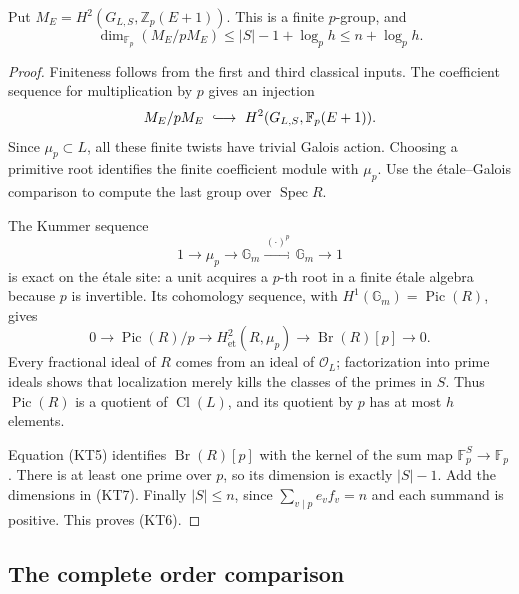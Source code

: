 \begin{lemma}\label{kt-rank}
Put \(M_E=H^2(G_{L,S},\mathbb Z_p(E+1))\).
This is a finite \(p\)-group, and
\[
 \dim_{\mathbb F_p}(M_E/pM_E)
       \le |S|-1+\log_p h
       \le n+\log_p h .
 \tag{KT6}
\]
\end{lemma}
\begin{proof}
Finiteness follows from the first and third classical
inputs.  The coefficient sequence for multiplication by
\(p\) gives an injection
\[
 M_E/pM_E\ \lhook\joinrel\longrightarrow\
       H^2(G_{L,S},\mathbb F_p(E+1)).
\]
Since \(\mu_p\subset L\), all these finite twists have
trivial Galois action.  Choosing a primitive root
identifies the finite coefficient module with \(\mu_p\).
Use the \'etale--Galois comparison to compute the
last group over \(\operatorname{Spec}R\).

The Kummer sequence
\[
 1\longrightarrow\mu_p\longrightarrow\mathbb G_m
       \xrightarrow{\,(\cdot)^p\,}\mathbb G_m
       \longrightarrow1
\]
is exact on the \'etale site: a unit acquires a \(p\)-th
root in a finite \'etale algebra because \(p\) is invertible.
Its cohomology sequence, with
\(H^1(\mathbb G_m)=\operatorname{Pic}(R)\), gives
\[
 0\longrightarrow\operatorname{Pic}(R)/p
  \longrightarrow H^2_{\mathrm{\acute et}}(R,\mu_p)
  \longrightarrow\operatorname{Br}(R)[p]
  \longrightarrow0.
 \tag{KT7}
\]
Every fractional ideal of \(R\) comes from an ideal of
\(\mathcal O_L\); factorization into prime ideals shows
that localization merely kills the classes of the
primes in \(S\).  Thus \(\operatorname{Pic}(R)\) is a
quotient of \(\operatorname{Cl}(L)\), and its quotient
by \(p\) has at most \(h\) elements.

Equation (KT5) identifies \(\operatorname{Br}(R)[p]\)
with the kernel of the sum map
\(\mathbb F_p^{S}\to\mathbb F_p\).
There is at least one prime over \(p\), so its dimension
is exactly \(|S|-1\).  Add the dimensions in (KT7).
Finally \(|S|\le n\), since
\(\sum_{v\mid p}e_vf_v=n\) and each summand is positive.
This proves (KT6).
\end{proof}

\subsection{The complete order comparison}

